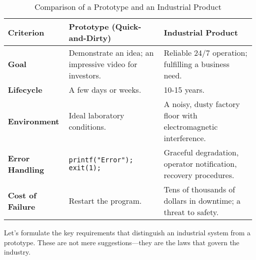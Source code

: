 
\begin{table}[h!]
    \caption{Comparison of a Prototype and an Industrial Product}
    \label{tab:prototype_vs_product}
    \centering
    \renewcommand{\arraystretch}{1.2}
    \begin{tabular}{p{} p{} p{}}
        \toprule
        \textbf{Criterion} & \textbf{Prototype (Quick-and-Dirty)} & \textbf{Industrial Product} \\
        \midrule
        \textbf{Goal} & Demonstrate an idea; an impressive video for investors. & Reliable 24/7 operation; fulfilling a business need. \\
        \textbf{Lifecycle} & A few days or weeks. & 10-15 years. \\
        \textbf{Environment} & Ideal laboratory conditions. & A noisy, dusty factory floor with electromagnetic interference. \\
        \textbf{Error Handling} & \texttt{printf("Error"); exit(1);} & Graceful degradation, operator notification, recovery procedures. \\
        \textbf{Cost of Failure} & Restart the program. & Tens of thousands of dollars in downtime; a threat to safety. \\
        \bottomrule
    \end{tabular}
\end{table}

Let's formulate the key requirements that distinguish an industrial system from a prototype. These are not mere suggestions—they are the laws that govern the industry.

